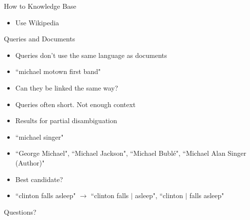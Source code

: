 \documentclass{beamer}
\begin{document}
\begin{frame}{How to Knowledge Base}
	\begin{itemize}
		\item Use Wikipedia
	\end{itemize}
\end{frame}

\begin{frame}{Queries and Documents}
	\begin{itemize}
		\item Queries don't use the same language as documents
		\item ``michael motown first band"
		\item Can they be linked the same way?
		\item Queries often short. Not enough context
		\item Results for partial disambiguation
		\item ``michael singer"
		\item ``George Michael", ``Michael Jackson", ``Michael Bublé", ``Michael Alan Singer (Author)"
		\item Best candidate?
		\item ``clinton falls asleep" $\rightarrow$ ``clinton falls $\vert$ asleep", ``clinton $\vert$ falls asleep"
	\end{itemize}
\end{frame}

\begin{frame}{Questions?}
\end{frame}
\end{document}
